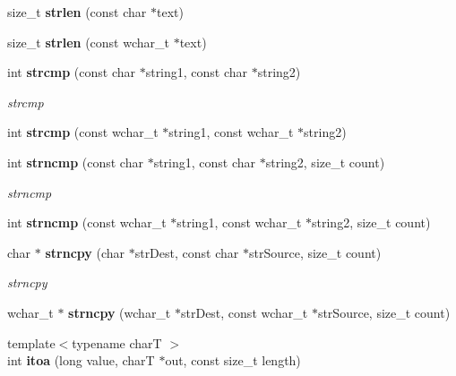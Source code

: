 \begin{DoxyCompactItemize}
\item 
size\+\_\+t {\bfseries strlen} (const char $\ast$text)\label{namespacestring__util_a733d7b92d48889fe1ee684a43ccf0095}

\item 
size\+\_\+t {\bfseries strlen} (const wchar\+\_\+t $\ast$text)\label{namespacestring__util_aaf8e108eb4f1d08b81118bb54d930b90}

\item 
int {\bf strcmp} (const char $\ast$string1, const char $\ast$string2)\label{namespacestring__util_a791b8d128151f4485bf887bf438b691f}

\begin{DoxyCompactList}\small\item\em strcmp \end{DoxyCompactList}\item 
int {\bfseries strcmp} (const wchar\+\_\+t $\ast$string1, const wchar\+\_\+t $\ast$string2)\label{namespacestring__util_ac56913f0992f2e3873742dfed7a3a139}

\item 
int {\bf strncmp} (const char $\ast$string1, const char $\ast$string2, size\+\_\+t count)\label{namespacestring__util_ae5007e89fd173108517cd5d6b0b9366c}

\begin{DoxyCompactList}\small\item\em strncmp \end{DoxyCompactList}\item 
int {\bfseries strncmp} (const wchar\+\_\+t $\ast$string1, const wchar\+\_\+t $\ast$string2, size\+\_\+t count)\label{namespacestring__util_a228b9144a3fca764257878d37ac774a3}

\item 
char $\ast$ {\bf strncpy} (char $\ast$str\+Dest, const char $\ast$str\+Source, size\+\_\+t count)\label{namespacestring__util_a955d4ceed010c00aa6b32eadface6558}

\begin{DoxyCompactList}\small\item\em strncpy \end{DoxyCompactList}\item 
wchar\+\_\+t $\ast$ {\bfseries strncpy} (wchar\+\_\+t $\ast$str\+Dest, const wchar\+\_\+t $\ast$str\+Source, size\+\_\+t count)\label{namespacestring__util_a5c7719a68a6781593c89931225aaf73a}

\item 
{\footnotesize template$<$typename charT $>$ }\\int {\bf itoa} (long value, charT $\ast$out, const size\+\_\+t length)\label{namespacestring__util_ad8c0e55cfd7dd74b275abd8f00d0bbd9}


\end{DoxyCompactItemize}
